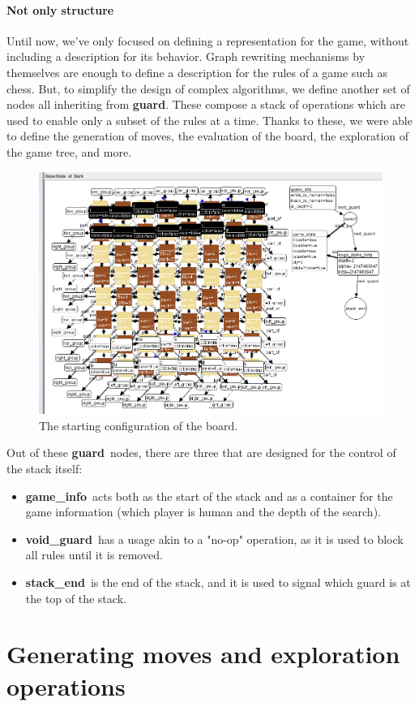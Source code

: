 \documentclass[a4paper, 10pt]{scrartcl}
\newcommand{\noderepr}[1]{\textsf{\textbf{#1}}}
\newcommand{\guard}{\noderepr{guard}}
\newcommand{\gameinfo}{\noderepr{game\_info}}
\newcommand{\void}{\noderepr{void\_guard}}
\newcommand{\stackend}{\noderepr{stack\_end}}
\begin{document}
    \paragraph*{Not only structure} Until now, we've only focused on defining a representation for the game, without including a description for its behavior. Graph rewriting mechanisms by themselves are enough to define a description for the rules of a game such as chess. But, to simplify the design of complex algorithms, we define another set of nodes all inheriting from \guard. These compose a stack of operations which are used to enable only a subset of the rules at a time. Thanks to these, we were able to define the generation of moves, the evaluation of the board, the exploration of the game tree, and more.
    \begin{figure}[H]
        \centering
        \includegraphics[width=.8\linewidth]{images/base_state.png}
        \caption{The starting configuration of the board.}
    \end{figure}
    Out of these \guard\ nodes, there are three that are designed for the control of the stack itself:
    \begin{itemize}
        \item \gameinfo\ acts both as the start of the stack and as a container for the game information (which player is human and the depth of the search).
        \item \void\ has a usage akin to a "no-op" operation, as it is used to block all rules until it is removed.
        \item \stackend\ is the end of the stack, and it is used to signal which guard is at the top of the stack.
    \end{itemize}

    \section{Generating moves and exploration operations}
\end{document}
